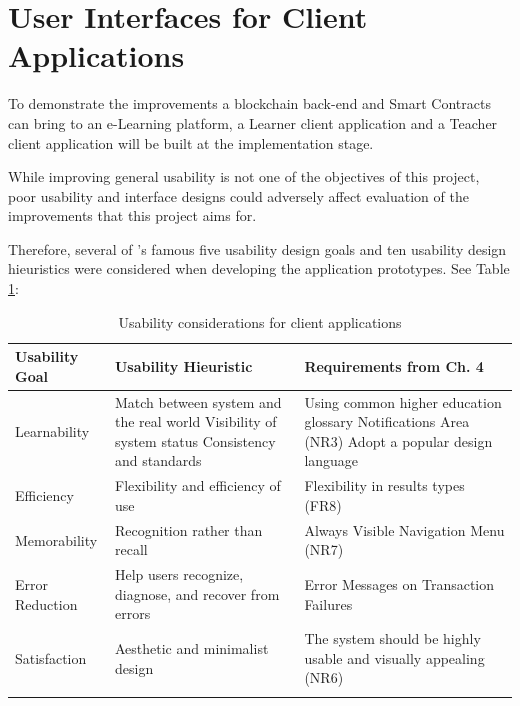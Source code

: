 \section{User Interfaces for Client Applications}

To demonstrate the improvements a blockchain back-end and Smart Contracts can bring to an e-Learning platform, a
Learner client application and a Teacher client application will be built at the implementation stage.

While improving general usability is not one of the objectives of this project, poor usability and interface designs
could adversely affect evaluation of the improvements that this project aims for.

Therefore, several of \citet{nielsen199510}'s famous five usability design goals and ten usability design hieuristics
were considered when developing the application prototypes. See Table \ref{table:ux_considerations}:

\begin{table}[!ht]
	\caption{Usability considerations for client applications}
	\centering
	\label{table:ux_considerations}
	\begin{tabularx}{\textwidth}{lXX}
		Usability Goal            & Usability Hieuristic                                    & Requirements from Ch. 4                                         \\
		\toprule
		Learnability              & Match between system and the real world\newline
		Visibility of system status \newline
		Consistency and standards & Using common higher education glossary \newline
		Notifications Area (NR3) \newline
		Adopt a popular design language                                                                                                                       \\
		\midrule
		Efficiency                & Flexibility and efficiency of use                       & Flexibility in results types (FR8)                              \\
		\midrule
		Memorability              & Recognition rather than recall                          & Always Visible Navigation Menu (NR7)                            \\
		\midrule
		Error Reduction           & Help users recognize, diagnose, and recover from errors & Error Messages on Transaction Failures                          \\
		\midrule
		Satisfaction              & Aesthetic and minimalist design                         & The system should be highly usable and visually appealing (NR6) \\                                                               \\
		\bottomrule
	\end{tabularx}
\end{table}


